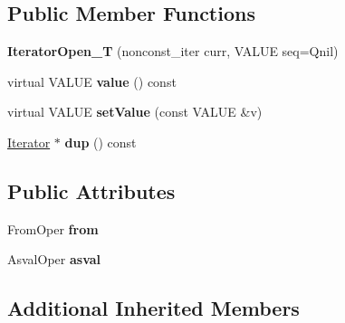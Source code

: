 \subsection*{Public Member Functions}
\begin{DoxyCompactItemize}
\item 
{\bfseries Iterator\+Open\+\_\+T} (nonconst\+\_\+iter curr, V\+A\+L\+UE seq=Qnil)\hypertarget{classswig_1_1IteratorOpen__T_aa4f93825ed9aa8fe769dd21b788a2754}{}\label{classswig_1_1IteratorOpen__T_aa4f93825ed9aa8fe769dd21b788a2754}

\item 
virtual V\+A\+L\+UE {\bfseries value} () const \hypertarget{classswig_1_1IteratorOpen__T_afccb46a33fc024e772f593b2bee34134}{}\label{classswig_1_1IteratorOpen__T_afccb46a33fc024e772f593b2bee34134}

\item 
virtual V\+A\+L\+UE {\bfseries set\+Value} (const V\+A\+L\+UE \&v)\hypertarget{classswig_1_1IteratorOpen__T_a0aefe0f06947d8b948b2a870f3e69bc5}{}\label{classswig_1_1IteratorOpen__T_a0aefe0f06947d8b948b2a870f3e69bc5}

\item 
\hyperlink{structswig_1_1Iterator}{Iterator} $\ast$ {\bfseries dup} () const \hypertarget{classswig_1_1IteratorOpen__T_ae6ac47fd792ce4d25122370b98e24673}{}\label{classswig_1_1IteratorOpen__T_ae6ac47fd792ce4d25122370b98e24673}

\end{DoxyCompactItemize}
\subsection*{Public Attributes}
\begin{DoxyCompactItemize}
\item 
From\+Oper {\bfseries from}\hypertarget{classswig_1_1IteratorOpen__T_a7b9c72f524d5e99da34687441c3fd022}{}\label{classswig_1_1IteratorOpen__T_a7b9c72f524d5e99da34687441c3fd022}

\item 
Asval\+Oper {\bfseries asval}\hypertarget{classswig_1_1IteratorOpen__T_a22260e47571dcb128a51aabbe353edf2}{}\label{classswig_1_1IteratorOpen__T_a22260e47571dcb128a51aabbe353edf2}

\end{DoxyCompactItemize}
\subsection*{Additional Inherited Members}


